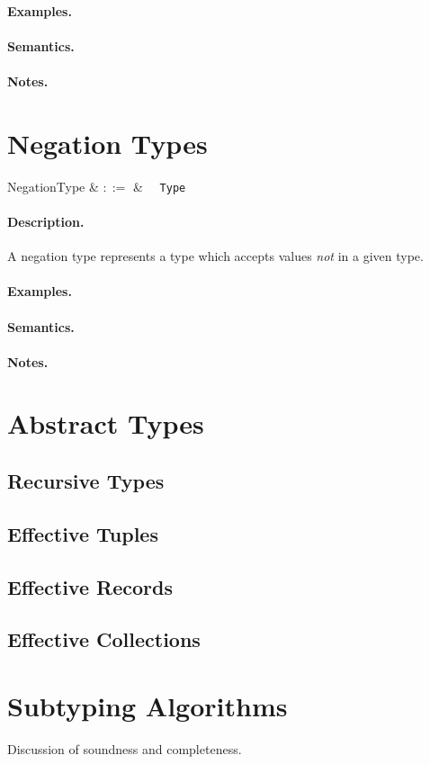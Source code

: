 \paragraph{Examples.}

\paragraph{Semantics.}

\paragraph{Notes.}


\section{Negation Types}

\begin{syntax}
  NegationType & $::=$ & \token{!}\ \ \verb+Type+\\
\end{syntax}

\paragraph{Description.}  A negation type represents a type which
accepts values {\em not} in a given type.

\paragraph{Examples.}

\paragraph{Semantics.}

\paragraph{Notes.}

\section{Abstract Types}
\subsection{Recursive Types}
\subsection{Effective Tuples}
\subsection{Effective Records}
\subsection{Effective Collections}

\section{Subtyping Algorithms}
Discussion of soundness and completeness.
